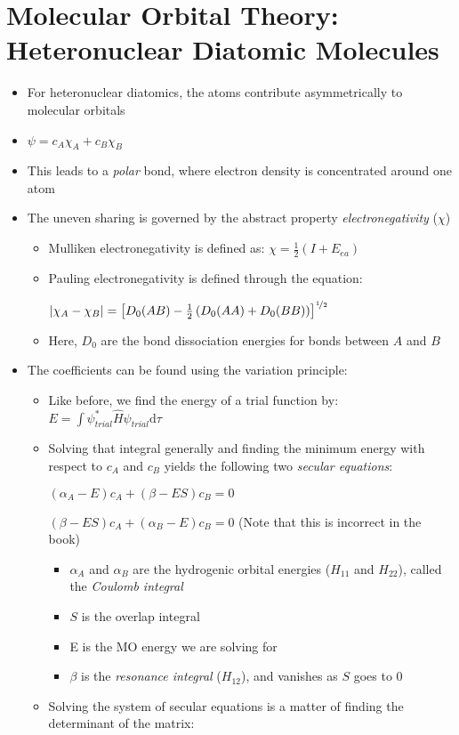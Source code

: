 \documentclass[12pt, openany, letterpaper]{memoir}
\begin{document}
\section{Molecular Orbital Theory: Heteronuclear Diatomic Molecules}
\begin{itemize}
	\item For heteronuclear diatomics, the atoms contribute asymmetrically to molecular orbitals
	\item $\psi = c_A\chi_A + c_B\chi_B$
	\item This leads to a \emph{polar} bond, where electron density is concentrated around one atom
	\item The uneven sharing is governed by the abstract property \emph{electronegativity} ($\chi$)
	\begin{itemize}
		\item Mulliken electronegativity is defined as: $\chi = \frac{1}{2}\left(I + E_{ea}\right)$
		\item Pauling electronegativity is defined through the equation:
		
		$\left|\chi_A-\chi_B\right| = \left[D_0(AB)-\frac{1}{2}\left(D_0(AA)+D_0(BB)\right)\right]^{\nicefrac{1}{2}}$
		\item Here, $D_0$ are the bond dissociation energies for bonds between $A$ and $B$
	\end{itemize}
	\item The coefficients can be found using the variation principle:
	\begin{itemize}
		\item Like before, we find the energy of a trial function by: $E = \displaystyle\int \psi^*_{trial}\hat{H}\psi_{trial}\mathrm{d}\tau$
		\item Solving that integral generally and finding the minimum energy with respect to $c_A$ and $c_B$ yields the following two \emph{secular equations}:
		
		$\left(\alpha_A-E\right)c_A + \left(\beta-ES\right)c_B=0$
		
		$\left(\beta-ES\right)c_A+\left(\alpha_B-E\right)c_B=0$ (Note that this is incorrect in the book)
		\begin{itemize}
			\item $\alpha_A$ and $\alpha_B$ are the hydrogenic orbital energies ($H_{11}$ and $H_{22}$), called the \emph{Coulomb integral}
			\item $S$ is the overlap integral
			\item E is the MO energy we are solving for
			\item $\beta$ is the \emph{resonance integral} ($H_{12}$), and vanishes as $S$ goes to $0$
		\end{itemize}
		\item Solving the system of secular equations is a matter of finding the determinant of the matrix:
		

\end{itemize}
\end{itemize}
\end{document}

